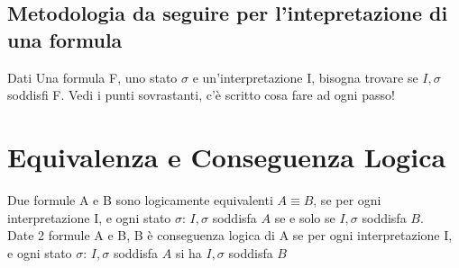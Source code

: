 \documentclass[11pt]{article}
\begin{document}
\subsection{Metodologia da seguire per l'intepretazione di una formula}
Dati Una formula F, uno stato $\sigma$ e un'interpretazione I, bisogna trovare se $I, \sigma$ soddisfi F. Vedi i punti sovrastanti, 
c'è scritto cosa fare ad ogni passo!
\section{Equivalenza e Conseguenza Logica}
Due formule A e B sono logicamente equivalenti $A \equiv B$, se per ogni interpretazione I, 
e ogni stato $\sigma$: $I, \sigma$ soddisfa $A$ se e solo se $I, \sigma$ soddisfa $B$.\\
Date 2 formule A e B, B è conseguenza logica di A se per ogni interpretazione I, 
e ogni stato $\sigma$: $I, \sigma$ soddisfa $A$ si ha $I, \sigma$ soddisfa $B$
\end{document}
